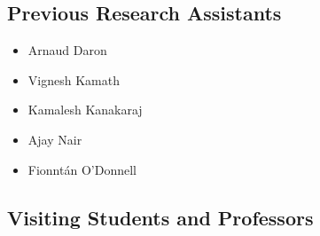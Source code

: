 \documentclass[10pt,a4paper]{res} %
\begin{document}
\begin{resume}
\subsection*{Previous Research Assistants}

\begin{itemize} \itemsep -2pt
\item Arnaud Daron
\item Vignesh Kamath
\item Kamalesh Kanakaraj
\item Ajay Nair
\item Fionnt\'{a}n O'Donnell
\end{itemize}

\subsection*{Visiting Students and Professors}


\end{resume}
\end{document}
